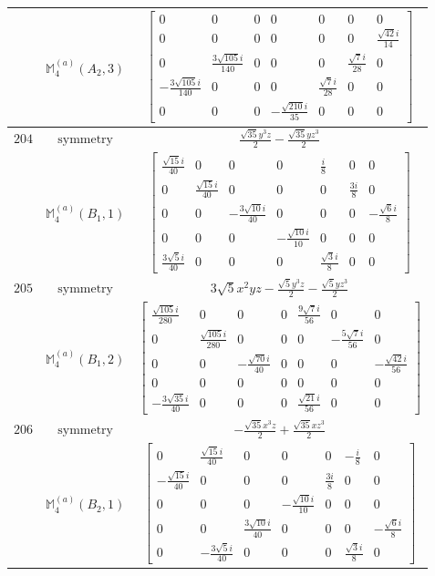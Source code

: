 \documentclass[fleqn,8pt,landscape]{jsarticle}
\begin{document}
\begin{longtable}{ccc}
$  $ & $ \mathbb{M}_{4}^{(a)}(A_{2},3) $ & $ \begin{bmatrix} 0 & 0 & 0 & 0 & 0 & 0 & 0 \\ 0 & 0 & 0 & 0 & 0 & 0 & \frac{\sqrt{42} i}{14} \\ 0 & \frac{3 \sqrt{105} i}{140} & 0 & 0 & 0 & \frac{\sqrt{7} i}{28} & 0 \\ - \frac{3 \sqrt{105} i}{140} & 0 & 0 & 0 & \frac{\sqrt{7} i}{28} & 0 & 0 \\ 0 & 0 & 0 & - \frac{\sqrt{210} i}{35} & 0 & 0 & 0 \end{bmatrix} $ \\ \hline
$ 204 $ & $ \text{symmetry} $ & $ \frac{\sqrt{35} y^{3} z}{2} - \frac{\sqrt{35} y z^{3}}{2} $ \\
$  $ & $ \mathbb{M}_{4}^{(a)}(B_{1},1) $ & $ \begin{bmatrix} \frac{\sqrt{15} i}{40} & 0 & 0 & 0 & \frac{i}{8} & 0 & 0 \\ 0 & \frac{\sqrt{15} i}{40} & 0 & 0 & 0 & \frac{3 i}{8} & 0 \\ 0 & 0 & - \frac{3 \sqrt{10} i}{40} & 0 & 0 & 0 & - \frac{\sqrt{6} i}{8} \\ 0 & 0 & 0 & - \frac{\sqrt{10} i}{10} & 0 & 0 & 0 \\ \frac{3 \sqrt{5} i}{40} & 0 & 0 & 0 & \frac{\sqrt{3} i}{8} & 0 & 0 \end{bmatrix} $ \\ \hline
$ 205 $ & $ \text{symmetry} $ & $ 3 \sqrt{5} x^{2} y z - \frac{\sqrt{5} y^{3} z}{2} - \frac{\sqrt{5} y z^{3}}{2} $ \\
$  $ & $ \mathbb{M}_{4}^{(a)}(B_{1},2) $ & $ \begin{bmatrix} \frac{\sqrt{105} i}{280} & 0 & 0 & 0 & \frac{9 \sqrt{7} i}{56} & 0 & 0 \\ 0 & \frac{\sqrt{105} i}{280} & 0 & 0 & 0 & - \frac{5 \sqrt{7} i}{56} & 0 \\ 0 & 0 & - \frac{\sqrt{70} i}{40} & 0 & 0 & 0 & - \frac{\sqrt{42} i}{56} \\ 0 & 0 & 0 & 0 & 0 & 0 & 0 \\ - \frac{3 \sqrt{35} i}{40} & 0 & 0 & 0 & \frac{\sqrt{21} i}{56} & 0 & 0 \end{bmatrix} $ \\ \hline
$ 206 $ & $ \text{symmetry} $ & $ - \frac{\sqrt{35} x^{3} z}{2} + \frac{\sqrt{35} x z^{3}}{2} $ \\
$  $ & $ \mathbb{M}_{4}^{(a)}(B_{2},1) $ & $ \begin{bmatrix} 0 & \frac{\sqrt{15} i}{40} & 0 & 0 & 0 & - \frac{i}{8} & 0 \\ - \frac{\sqrt{15} i}{40} & 0 & 0 & 0 & \frac{3 i}{8} & 0 & 0 \\ 0 & 0 & 0 & - \frac{\sqrt{10} i}{10} & 0 & 0 & 0 \\ 0 & 0 & \frac{3 \sqrt{10} i}{40} & 0 & 0 & 0 & - \frac{\sqrt{6} i}{8} \\ 0 & - \frac{3 \sqrt{5} i}{40} & 0 & 0 & 0 & \frac{\sqrt{3} i}{8} & 0 \end{bmatrix} $ \\ \hline

\end{longtable}
\end{document}
